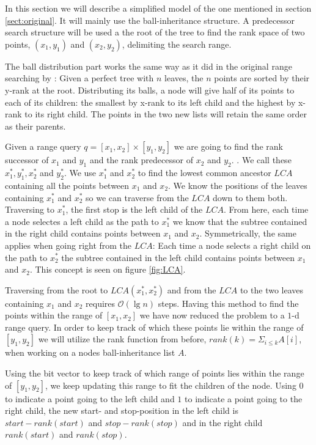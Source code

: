 In this section we will describe a simplified model of the one mentioned in section \ref{sect:original}. It will mainly use the ball-inheritance structure. A predecessor search structure will be used a the root of the tree to find the rank space of two points, $(x_1,y_1)$ and $(x_2,y_2)$, delimiting the search range.

The ball distribution part works the same way as it did in the original range searching by \citeauthor{chanetal}: Given a perfect tree with $n$ leaves, the $n$ points are sorted by their y-rank at the root. Distributing its balls, a node will give half of its points to each of its children: the smallest by x-rank to its left child and the highest by x-rank to its right child. The points in the two new lists will retain the same order as their parents.

Given a range query $q = [x_1, x_2] \times [y_1, y_2]$ we are going to find the rank successor of $x_1$ and $y_1$ and the rank predecessor of $x_2$ and $y_2$. . We call these $x^*_1, y^*_1, x^*_2$ and $y^*_2$. We use $x^*_1$ and $x^*_2$ to find the lowest common ancestor $LCA$ containing all the points between $x_1$ and $x_2$. We know the positions of the leaves containing $x^*_1$ and $x^*_2$ so we can traverse from the $LCA$ down to them both. Traversing to $x^*_1$, the first stop is the left child of the $LCA$. From here, each time a node selectes a left child as the path to $x^*_1$ we know that the subtree contained in the right child contains points between $x_1$ and $x_2$. Symmetrically, the same applies when going right from the $LCA$: Each time a node selects a right child on the path to $x^*_2$ the subtree contained in the left child contains points between $x_1$ and $x_2$. This concept is seen on figure \ref{fig:LCA}.

Traversing from the root to $LCA(x^*_1, x^*_2)$ and from the $LCA$ to the two leaves containing $x_1$ and $x_2$ requires $\mathcal{O}(\lg n)$ steps. Having this method to find the points within the range of $[x_1, x_2]$ we have now reduced the problem to a $1$-d range query. In order to keep track of which these points lie within the range of $[y_1, y_2]$ we will utilize the rank function from before, $rank(k) = \Sigma_{i \leq k} A[i]$, when working on a nodes ball-inheritance list $A$.

Using the bit vector to keep track of which range of points lies within the range of $[y_1, y_2]$, we keep updating this range to fit the children of the node. Using $0$ to indicate a point going to the left child and $1$ to indicate a point going to the right child, the new start- and stop-position in the left child is $start-rank(start)$ and $stop-rank(stop)$ and in the right child $rank(start)$ and $rank(stop)$. 


